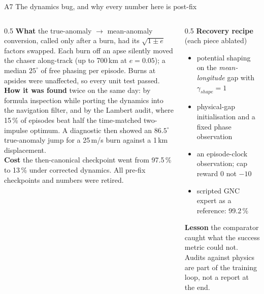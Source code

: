 \documentclass[aspectratio=169,11pt]{beamer}
\begin{document}
\begin{frame}{A7 \; The dynamics bug, and why every number here is post-fix}
\small
\begin{columns}[T]
\begin{column}{0.5\textwidth}
\textbf{What} \; the true-anomaly $\to$ mean-anomaly conversion, called only after a burn, had its $\sqrt{1\pm e}$ factors swapped. Each burn off an apse silently moved the chaser along-track (up to 700\,km at $e=0.05$); a median $25^\circ$ of free phasing per episode. Burns at apsides were unaffected, so every unit test passed.\\[2mm]
\textbf{How it was found} \; twice on the same day: by formula inspection while porting the dynamics into the navigation filter, and by the Lambert audit, where 15\,\% of episodes beat half the time-matched two-impulse optimum. A diagnostic then showed an $86.5^\circ$ true-anomaly jump for a 25\,m/s burn against a 1\,km displacement.\\[2mm]
\textbf{Cost} \; the then-canonical checkpoint went from 97.5\,\% to 13\,\% under corrected dynamics. All pre-fix checkpoints and numbers were retired.
\end{column}
\begin{column}{0.5\textwidth}
\textbf{Recovery recipe} (each piece ablated)
\begin{itemize}
  \item potential shaping on the \emph{mean-longitude} gap with $\gamma_{shape}=1$
  \item physical-gap initialisation and a fixed phase observation
  \item an episode-clock observation; cap reward 0 not $-10$
  \item scripted GNC expert as a reference: 99.2\,\%
\end{itemize}
\textbf{Lesson} \; the comparator caught what the success metric could not. Audits against physics are part of the training loop, not a report at the end.
\end{column}
\end{columns}
\end{frame}
\end{document}
